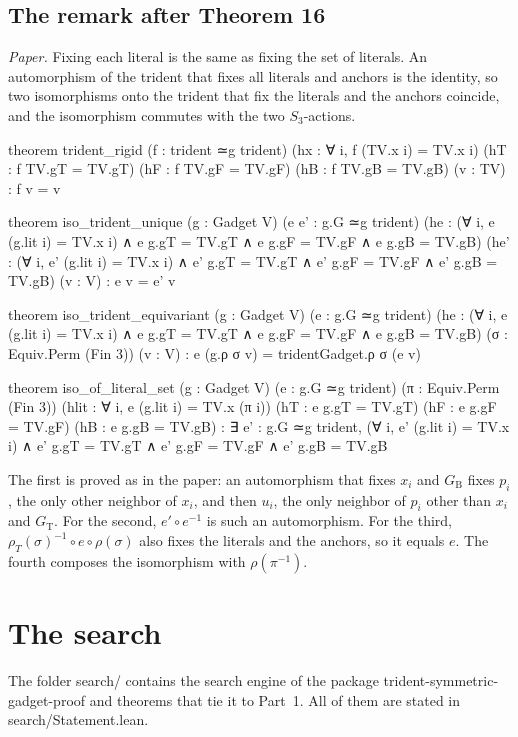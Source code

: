 \documentclass[11pt,a4paper]{article}
\newcommand{\leanus}{\textunderscore\allowbreak}
\newcommand{\lean}[1]{{\ttfamily\let\_\leanus #1}}
\newcommand{\GT}{G_{\mathrm{T}}}
\newcommand{\GB}{G_{\mathrm{B}}}
\begin{document}
\subsection{The remark after Theorem 16}\label{sec:unique}
\emph{Paper.} Fixing each literal is the same as fixing the set of literals.
An automorphism of the trident that fixes all literals and anchors is the
identity, so two isomorphisms onto the trident that fix the literals and the
anchors coincide, and the isomorphism commutes with the two $S_3$-actions.
\begin{code}
theorem trident_rigid (f : trident ≃g trident) (hx : ∀ i, f (TV.x i) = TV.x i)
    (hT : f TV.gT = TV.gT) (hF : f TV.gF = TV.gF) (hB : f TV.gB = TV.gB) (v : TV) :
    f v = v

theorem iso_trident_unique (g : Gadget V) (e e' : g.G ≃g trident)
    (he : (∀ i, e (g.lit i) = TV.x i) ∧ e g.gT = TV.gT ∧ e g.gF = TV.gF ∧ e g.gB = TV.gB)
    (he' : (∀ i, e' (g.lit i) = TV.x i) ∧ e' g.gT = TV.gT ∧ e' g.gF = TV.gF ∧
      e' g.gB = TV.gB) (v : V) : e v = e' v

theorem iso_trident_equivariant (g : Gadget V) (e : g.G ≃g trident)
    (he : (∀ i, e (g.lit i) = TV.x i) ∧ e g.gT = TV.gT ∧ e g.gF = TV.gF ∧ e g.gB = TV.gB)
    (σ : Equiv.Perm (Fin 3)) (v : V) : e (g.ρ σ v) = tridentGadget.ρ σ (e v)

theorem iso_of_literal_set (g : Gadget V) (e : g.G ≃g trident) (π : Equiv.Perm (Fin 3))
    (hlit : ∀ i, e (g.lit i) = TV.x (π i))
    (hT : e g.gT = TV.gT) (hF : e g.gF = TV.gF) (hB : e g.gB = TV.gB) :
    ∃ e' : g.G ≃g trident,
      (∀ i, e' (g.lit i) = TV.x i) ∧ e' g.gT = TV.gT ∧ e' g.gF = TV.gF ∧ e' g.gB = TV.gB
\end{code}
The first is proved as in the paper: an automorphism that fixes $x_i$ and
$\GB$ fixes $p_i$, the only other neighbor of $x_i$, and then $u_i$, the
only neighbor of $p_i$ other than $x_i$ and $\GT$. For the second, $e'\circ
e^{-1}$ is such an automorphism. For the third, $\rho_T(\sigma)^{-1}\circ
e\circ\rho(\sigma)$ also fixes the literals and the anchors, so it equals
$e$. The fourth composes the isomorphism with $\rho(\pi^{-1})$.

\section{The search}\label{sec:search}

The folder \lean{search/} contains the search engine of the package
\lean{trident-symmetric-gadget-proof} and theorems that tie it to Part~1.
All of them are stated in \lean{search/Statement.lean}.
\end{document}
